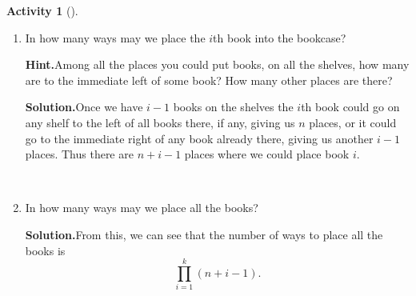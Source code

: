 \documentclass[10pt,]{book}
\theoremstyle{plain}
\theoremstyle{definition}
\newtheorem{activity}[project]{Activity}
\numberwithin{equation}{chapter}
\begin{document}
\begin{activity}[]
\begin{enumerate}[label=(\alph*)]
~\par
\item In how many ways may we place the \(i\)th book into the bookcase?%
\par\medskip\noindent%
\textbf{Hint.}\quad Among all the places you could put books, on all the shelves, how many are to the immediate left of some book? How many other places are there?%
\par\medskip\noindent%
\textbf{Solution.}\quad Once we have \(i-1\) books on the shelves the \(i\)th book could go on any shelf to the left of all books there, if any, giving us \(n\) places, or it could go to the immediate right of any book already there, giving us another \(i-1\) places. Thus there are \(n+i-1\) places where we could place book  \(i\).%

~\par
\item In how many ways may we place all the books?%
\par\medskip\noindent%
\textbf{Solution.}\quad From this, we can see that the number of ways to place all the books is%
\begin{equation*}
\prod_{i=1}^k (n+i-1).
\end{equation*}
%

\end{enumerate}
\end{activity}
\end{document}
